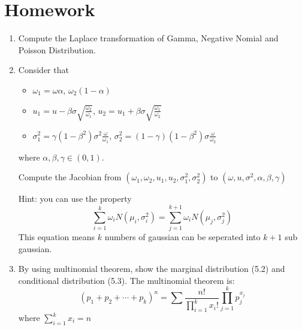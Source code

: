 \section{Homework}
	\begin{enumerate}
		\item Compute the Laplace transformation of Gamma, Negative Nomial and Poisson Distribution.
		
		\item Consider that 
		\begin{itemize}
			\item $\omega_1 = \omega \alpha$, $\omega_2(1-\alpha)$
			\item $u_1 = u-\beta \sigma \sqrt{\frac{\omega_2}{\omega_1}}$, $u_2 = u_1+\beta \sigma \sqrt{\frac{\omega_1}{\omega_2}}$
			\item $\sigma_1^2 = \gamma(1-\beta^2)\sigma^2\frac{\omega}{\omega_1}$, $\sigma^2_2 = (1-\gamma)(1-\beta^2)\sigma\frac{\omega}{\omega_2}$
		\end{itemize}
	where $\alpha, \beta, \gamma \in (0, 1)$.
	
	Compute the Jacobian from $(\omega_1, \omega_2, u_1, u_2, \sigma_1^2, \sigma_2^2)$ to $(\omega, u, \sigma^2, \alpha, \beta, \gamma)$
	
	Hint: you can use the property $$\sum_{i = 1}^{k} \omega_i  N(\mu_i, \sigma_i^2) = \sum_{j=1}^{k+1}\omega_i N(\mu_j, \sigma_j^2)$$
	This equation means $k$ numbers of gaussian can be seperated into $k+1$ sub gaussian.
	
	\item By using multinomial theorem, show the marginal distribution (5.2) and conditional distribution (5.3). 
	The multinomial theorem is:
	$$(p_1+p_2+\cdots +p_k)^n = \sum \frac{n!}{\prod_{i = 1}^{k}x_i!}\prod_{j = 1}^{k}p_j^{x_j}$$
	where $\sum_{i = 1}^{k} x_i = n$
	\end{enumerate}